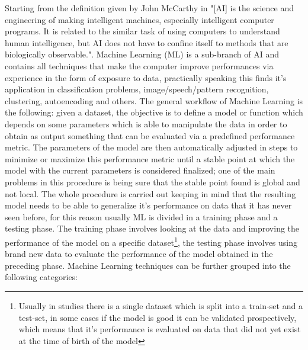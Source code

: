 Starting from the definition given by John McCarthy in \cite{AI_def} "[AI] is the science and engineering of making intelligent machines, especially intelligent computer programs. It is related to the similar task of using computers to understand human intelligence, but AI does not have to confine itself to methods that are biologically observable.". Machine Learning (ML) is a sub-branch of AI and contains all techniques that make the computer improve performances via experience in the form of exposure to data, practically speaking this finds it's application in classification problems, image/speech/pattern recognition, clustering, autoencoding and others. The general workflow of Machine Learning is the following: given a dataset, the objective is to define a model or function  which depends on some parameters which is able to manipulate the data in order to obtain as output something that can be evaluated via a predefined performance metric. The parameters of the model are then automatically adjusted in steps to minimize or maximize this performance metric until a stable point at which the model with the current parameters is considered finalized; one of the main problems in this procedure is being sure that the stable point found is global and not local. The whole procedure is carried out keeping in mind that the resulting model needs to be able to generalize it's performance on data that it has never seen before, for this reason usually ML is divided in a training phase and a testing phase. The training phase involves looking at the data and improving the performance of the model on a specific dataset\footnote{Usually in studies there is a single dataset which is split into a train-set and a test-set, in some cases if the model is good it can be validated prospectively, which means that it's performance is evaluated on data that did not yet exist at the time of birth of the model}, the testing phase involves using brand new data to evaluate the performance of the model obtained in the preceding phase. Machine Learning techniques can be further grouped into the following categories:

